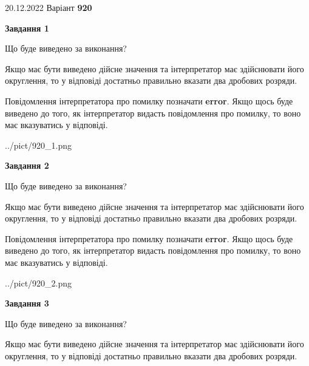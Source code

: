 \documentclass[12pt, ukrainian]{article}
\begin{document}
{20.12.2022 Варіант \No \textbf { 920 }\par}
{
\begin {Large}

{\begin {center}\textbf{Завдання 1}\end {center}}\par
Що буде виведено за виконання? \par

Якщо має бути виведено дійсне значення та інтерпретатор має здійснювати його округлення, 
то у відповіді достатньо правильно вказати два дробових розряди.

Повідомлення інтерпретатора про помилку позначати \textbf{error}.
Якщо щось буде виведено до того, як інтерпретатор видасть повідомлення про помилку, 
то воно має вказуватись у відповіді. \par

\begin{center}
	{../pict/920_1.png}
\end{center}
\newpage

{\begin {center}\textbf{Завдання 2}\end {center}}\par
Що буде виведено за виконання? \par

Якщо має бути виведено дійсне значення та інтерпретатор має здійснювати його округлення, 
то у відповіді достатньо правильно вказати два дробових розряди.

Повідомлення інтерпретатора про помилку позначати \textbf{error}.
Якщо щось буде виведено до того, як інтерпретатор видасть повідомлення про помилку, 
то воно має вказуватись у відповіді. \par

\begin{center}
	{../pict/920_2.png}
\end{center}
\newpage

{\begin {center}\textbf{Завдання 3}\end {center}}\par
Що буде виведено за виконання? \par

Якщо має бути виведено дійсне значення та інтерпретатор має здійснювати його округлення, 
то у відповіді достатньо правильно вказати два дробових розряди.


\end{Large}}
\end{document}
